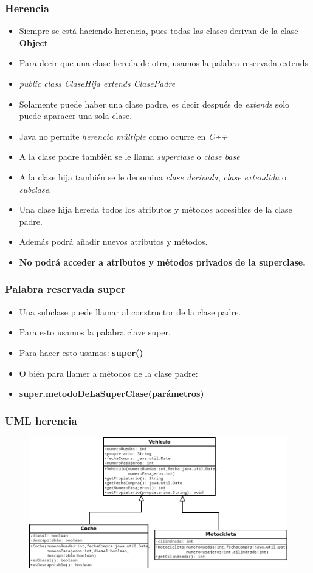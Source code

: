 \documentclass{beamer}
\begin{document}
\begin{frame}
\frametitle{Herencia}
\begin{itemize}[<+->]
\item Siempre se está haciendo herencia, pues todas las clases derivan de la clase \textbf{Object}
\item Para decir que una clase hereda de otra, usamos la palabra reservada \alert{extends}
\item \emph{public class ClaseHija extends ClasePadre}
\item Solamente puede haber una clase padre, es decir después de \emph{extends} solo puede aparacer una sola clase.
\item Java no permite \emph{herencia múltiple} como ocurre en \emph{C++}
\item A la clase padre también se le llama \emph{superclase} o \emph{clase base}
\item A la clase hija también se le denomina \emph{clase derivada}, \emph{clase extendida} o \emph{subclase}.
\item Una clase hija hereda todos los atributos y métodos accesibles de la clase padre.
\item Además podrá añadir nuevos atributos y métodos.
\item \textbf{No podrá acceder a atributos y métodos privados de la superclase.}
\end{itemize}
\end{frame}

\begin{frame}
\frametitle{Palabra reservada super}
\begin{itemize}[<+->]
\item Una subclase puede llamar al constructor de la clase padre.
\item Para esto usamos la palabra clave \alert{super}.
\item Para hacer esto usamos: \textbf{super()}
\item O bién para llamer a métodos de la clase padre:
\item \textbf{super.metodoDeLaSuperClase(parámetros)}
\end{itemize} 
\end{frame}

\begin{frame}
\frametitle{UML herencia}
\begin{figure}
\includegraphics[scale=0.35]{imagenes/uml.png}
\end{figure}
\end{frame}
\end{document}
